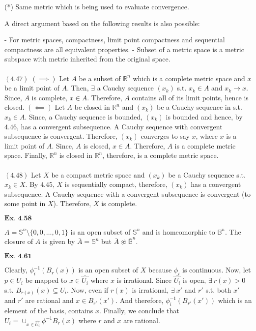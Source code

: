 \documentclass{article}
\begin{document}
(*) Same metric which is being used to evaluate convergence.

A direct argument based on the following results is also possible:

- For metric spaces, compactness, limit point compactness and sequential compactness are all equivalent properties.
- Subset of a metric space is a metric subspace with metric inherited from the original space.\\~\\

$(\mathbf{4.47})$ $(\implies)$ Let $A$ be a subset of $\mathbb{R}^n$ which is a complete metric space and $x$ be a limit point of $A$. Then, $\exists$ a Cauchy sequence $(x_k)$ s.t. $x_k \in A$ and $x_k \rightarrow x$. Since, $A$ is complete, $x \in A$. Therefore, $A$ contains all of its limit points, hence is closed. $(\impliedby)$ Let $A$ be closed in $\mathbb{R}^n$ and $(x_k)$ be a Cauchy sequence in s.t. $x_k \in A$. Since, a Cauchy sequence is bounded, $(x_k)$ is bounded and hence, by $\mathbf{4.46}$, has a convergent subsequence. A Cauchy sequence with convergent subsequence is convergent. Therefore, $(x_k)$ converges to say $x$, where $x$ is a limit point of $A$. Since, $A$ is closed, $x \in A$. Therefore, $A$ is a complete metric space. Finally, $\mathbb{R}^n$ is closed in $\mathbb{R}^n$, therefore, is a complete metric space.\\~\\

$\mathbf{(4.48)}$ Let $X$ be a compact metric space and $(x_k)$ be a Cauchy sequence s.t. $x_k \in X$. By $\mathbf{4.45}$, $X$ is sequentially compact, therefore, $(x_k)$ has a convergent subsequence. A Cauchy sequence with a convergent subsequence is convergent (to some point in $X$). Therefore, $X$ is complete.



\vspace{0.2in}

${\textbf{Ex. 4.58}}$

$A=\mathbb{S}^n\setminus\{0,0,\ldots,0,1\}$ is an open subset of $\mathbb{S}^n$ and is homeomorphic to $\mathbb{B}^n$. The closure of $A$ is given by $\bar{A} = \mathbb{S}^n$ but $\bar{A}\not\approx \bar{\mathbb{B}}^n$.

\vspace{0.2in}

${\textbf{Ex. 4.61}}$

Clearly, $\phi_i^{-1}(B_{r}(x))$ is an open subset of $X$ because $\phi_i$ is continuous. Now, let $p \in U_i$ be mapped to $x \in \hat{U_i}$ where $x$ is irrational. Since $\hat{U_i}$ is open, $\exists\ r(x)>0$ s.t. $B_{r(x)}(x) \subseteq \hat{U_i}$. Now, even if $r(x)$ is irrational, $\exists\ x'$ and $r'$ s.t. both $x'$ and $r'$ are rational and $x \in B_{r'}(x')$. And therefore, $\phi_i^{-1}(B_{r'}(x'))$ which is an element of the basis, contains $x$. Finally, we conclude that $U_i = \cup_{x \in \hat{U_i}}\phi^{-1}B_{r}(x)$ where $r$ and $x$ are rational.
\end{document}
